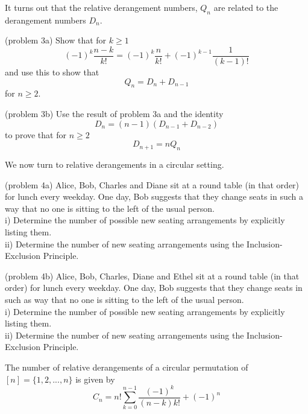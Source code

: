 \documentclass[handout]{ximera}
\begin{document}
It turns out that the relative derangement numbers, $Q_n$ are related to the derangement numbers $D_n$.

\begin{problem}(problem 3a)  Show that for $k \geq 1$
\[
(-1)^k \frac{n-k}{k!} = (-1)^k \frac{n}{k!} + (-1)^{k-1} \frac{1}{(k-1)!}
\]
and use this to show that 
\[
Q_n = D_n + D_{n-1}
\]
for $n \geq 2$.
\end{problem}


\begin{problem}(problem 3b) Use the result of problem 3a and the identity 
\[
D_n = (n-1)(D_{n-1} + D_{n-2})
\]
 to prove that for $n \geq 2$
\[
D_{n+1} = nQ_n
\]
\end{problem}

We now turn to relative derangements in a circular setting.

\begin{problem}(problem 4a)
Alice, Bob, Charles and Diane sit at a round table (in that order) for lunch every weekday. One day, Bob suggests 
that they change seats in such a way that no one is sitting to the left of the usual person.\\
i) Determine the number of possible new seating arrangements by explicitly listing them. \\
ii) Determine the number of new seating arrangements using the Inclusion-Exclusion Principle.
\end{problem}

\begin{problem}(problem 4b)
Alice, Bob, Charles, Diane and Ethel sit at a round table (in that order) for lunch every weekday. One day, Bob suggests 
that they change seats in such as way that no one is sitting to the left of the usual person.\\
i) Determine the number of possible new seating arrangements by explicitly listing them. \\
ii) Determine the number of new seating arrangements using the Inclusion-Exclusion Principle.
\end{problem}

\begin{proposition}
The number of relative derangements of a circular permutation of $[n] = \{1, 2, ..., n\}$ is given by
\[
C_n = n!\sum_{k=0}^{n-1} \frac{(-1)^k}{(n-k)k!} + (-1)^n
\]
\end{proposition}
\end{document}
